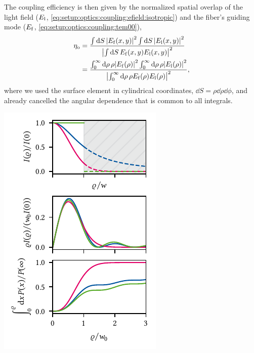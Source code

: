 The coupling efficiency is then given by the normalized spatial overlap of the light field ($E_{\mathrm{l}}$, \cref{eq:setup:optics:coupling:efield:isotropic}) and the fiber's guiding mode ($E_{\mathrm{f}}$, \cref{eq:setup:optics:coupling:tem00}),
\begin{equation}\label{eq:setup:optics:coupling:overlap}
    \begin{split}
        \eta_{\mathrm{o}} &= \frac{\int\dd{S}\abs{E_{\mathrm{f}}(x, y)}^2\int\dd{S}\abs{E_{\mathrm{l}}(x, y)}^2}{\abs{\int\dd{S} E_{\mathrm{f}}(x, y) E_{\mathrm{l}}(x, y)}^2} \\
                      &= \frac{\int_{0}^{\infty}\dd{\rho}\rho\abs{E_{\mathrm{f}}(\rho)}^2\int_{0}^{\infty}\dd{\rho}\rho\abs{E_{\mathrm{l}}(\rho)}^2}{\abs{\int_{0}^{\infty}\dd{\rho}\rho E_{\mathrm{f}}(\rho) E_{\mathrm{l}}(\rho)}^2},
    \end{split}
\end{equation}
where we used the surface element in cylindrical coordinates, $\dd{S}=\rho\dd{\rho}\dd{\phi}$, and already cancelled the angular dependence that is common to all integrals.

\begin{marginfigure}
    \centering
    \includegraphics{img/pdf/setup/modes_1d}
    \caption[]{}
    \label{fig:setup:optics:coupling:modes_1d}
\end{marginfigure}

